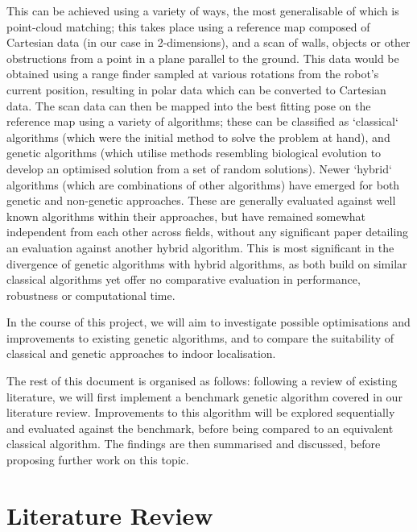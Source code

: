 \documentclass[authoryearcitations]{UoYCSproject}
\begin{document}
\color{red}
This can be achieved using a variety of ways, the most generalisable of which is point-cloud matching; this takes place using a reference map composed of Cartesian data (in our case in 2-dimensions), and a scan of walls, objects or other obstructions from a point in a plane parallel to the ground. This data would be obtained using a range finder sampled at various rotations from the robot's current position, resulting in polar data which can be converted to Cartesian data. The scan data can then be mapped into the best fitting pose on the reference map using a variety of algorithms; these can be classified as `classical` algorithms (which were the initial method to solve the problem at hand), and genetic algorithms (which utilise methods resembling biological evolution to develop an optimised solution from a set of random solutions). Newer `hybrid` algorithms (which are combinations of other algorithms) have emerged for both genetic and non-genetic approaches. These are generally evaluated against well known algorithms within their approaches, but have remained somewhat independent from each other across fields, without any significant paper detailing an evaluation against another hybrid algorithm. This is most significant in the divergence of genetic algorithms with hybrid algorithms, as both build on similar classical algorithms yet offer no comparative evaluation in performance, robustness or computational time.\newline

In the course of this project, we will aim to investigate possible optimisations and improvements to existing genetic algorithms, and to compare the suitability of classical and genetic approaches to indoor localisation. \newline

The rest of this document is organised as follows: following a review of existing literature, we will first implement a benchmark genetic algorithm covered in our literature review. Improvements to this algorithm will be explored sequentially and evaluated against the benchmark, before being compared to an equivalent classical algorithm. The findings are then summarised and discussed, before proposing further work on this topic.

\color{black}

\chapter{Literature Review}
\end{document}
